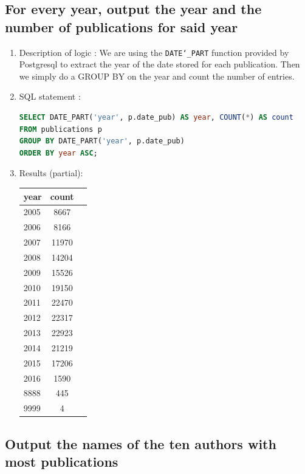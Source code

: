 \documentclass[doubleside, titlepage]{article}
\begin{document}
\subsection{For every year, output the year and the number of publications for said year}
	\begin{enumerate}
	\item Description of logic : We are using the \texttt{DATE\char`_PART} function provided by Postgresql to extract the year of the date stored for each publication. Then
      we simply do a GROUP BY on the year and count the number of entries.
	\item SQL statement :
		\begin{lstlisting}[language=SQL,showspaces=false,basicstyle=\ttfamily,numberstyle=\tiny,commentstyle=\color{gray}]
SELECT DATE_PART('year', p.date_pub) AS year, COUNT(*) AS count
FROM publications p
GROUP BY DATE_PART('year', p.date_pub)
ORDER BY year ASC;
		\end{lstlisting}

	\item Results (partial):\\

	\begin{tabular}{|l|c|r|}
  \hline
  year & count \\
  \hline
2005 & 	8667\\
2006 & 	8166\\
2007 & 	11970\\
2008 & 	14204\\
2009 & 	15526\\
2010 & 	19150\\
2011 & 	22470\\
2012 & 	22317\\
2013 & 	22923\\
2014 & 	21219\\
2015 & 	17206\\
2016 & 	1590\\
8888 & 	445\\
9999 & 	4\\
\hline
\end{tabular}

	\end{enumerate}
	

\subsection{Output the names of the ten authors with most publications}
\end{document}
